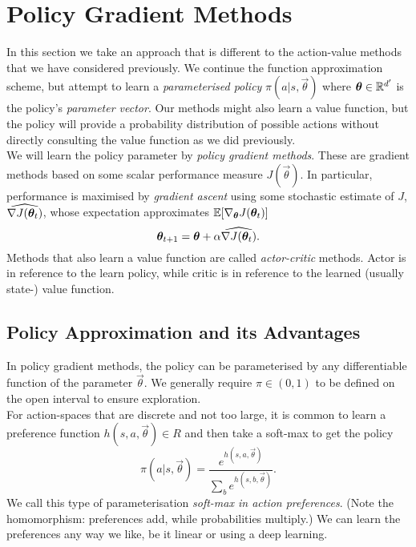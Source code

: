 \section{Policy Gradient Methods}

In this section we take an approach that is different to the action-value methods that we have considered previously. We continue the function approximation scheme, but attempt to learn a \emph{parameterised policy} $\pi(a \vert{} s, \vec{\theta})$ where $\boldsymbol{\theta} \in \mathbb{R}{}^{d'}$ is the policy's \emph{parameter vector}. Our methods might also learn a value function, but the policy will provide a probability distribution of possible actions without directly consulting the value function as we did previously. \\

We will learn the policy parameter by \emph{policy gradient methods}. These are gradient methods based on some scalar performance measure $J(\vec{\theta})$. In particular, performance is maximised by \emph{gradient ascent} using some stochastic estimate of $J$, $\widehat{\nabla J(\boldsymbol{\theta}_t)}$, whose expectation approximates $\mathbb{E}{}[\nabla_{\boldsymbol{\theta}} J(\boldsymbol{\theta}_t)]$
\[
    \boldsymbol{\theta}_{t+1} = \boldsymbol{\theta} + \alpha \widehat{\nabla J(\boldsymbol{\theta}_t)}.
\]
Methods that also learn a value function are called \emph{actor-critic} methods. Actor is in reference to the learn policy, while critic is in reference to the learned (usually state-) value function.


\subsection{Policy Approximation and its Advantages}

In policy gradient methods, the policy can be parameterised by any differentiable function of the parameter $\vec{\theta}$. We generally require $\pi \in (0, 1)$ to be defined on the open interval to ensure exploration. \\

For action-spaces that are discrete and not too large, it is common to learn a preference function $h(s, a, \vec{\theta}) \in R{}$ and then take a soft-max to get the policy
\[
    \pi(a \vert{} s, \vec{\theta}) = \frac{e^{h(s, a, \vec{\theta})}}{\sum_b e^{h(s, b, \vec{\theta})}}.
\]
We call this type of parameterisation \emph{soft-max in action preferences}. (Note the homomorphism: preferences add, while probabilities multiply.) We can learn the preferences any way we like, be it linear or using a deep learning.\\

